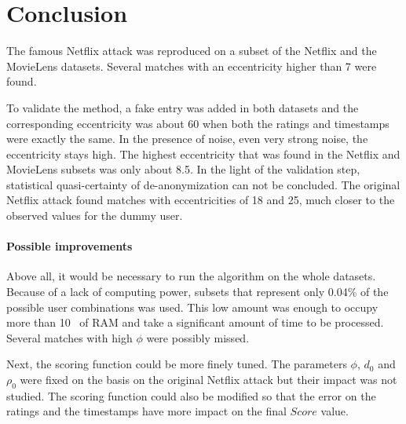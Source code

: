 \section{Conclusion}

The famous Netflix attack was reproduced on a subset of the Netflix and the MovieLens datasets. Several matches with an eccentricity higher than 7 were found.

To validate the method, a fake entry was added in both datasets and the corresponding eccentricity was about 60 when both the ratings and timestamps were exactly the same. In the presence of noise, even very strong noise, the eccentricity stays high. The highest eccentricity that was found in the Netflix and MovieLens subsets was only about 8.5. In the light of the validation step, statistical quasi-certainty of de-anonymization can not be concluded. The original Netflix attack found matches with eccentricities of 18 and 25, much closer to the observed values for the dummy user.

\newpage
\paragraph{Possible improvements} \mbox{}

Above all, it would be necessary to run the algorithm on the whole datasets. Because of a lack of computing power, subsets that represent only 0.04\% of the possible user combinations was used. This low amount was enough to occupy more than 10\si{\giga\byte} of RAM and take a significant amount of time to be processed. Several matches with high $\phi$ were possibly missed.

Next, the scoring function could be more finely tuned. The parameters $\phi$, $d_0$ and $\rho_0$ were fixed on the basis on the original Netflix attack but their impact was not studied. The scoring function could also be modified so that the error on the ratings and the timestamps have more impact on the final $Score$ value.